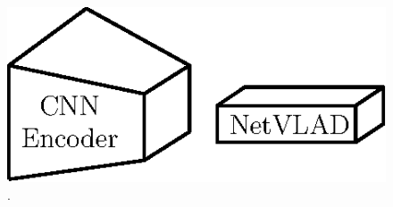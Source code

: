 \begin{figure}
	\centering

	\includegraphics[width=\linewidth]{related_work/enc+vlad}
	
	\caption[]{\label{fig:triplet_ex} \textbf{} .}	

\end{figure}